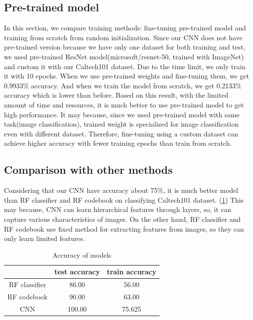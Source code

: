 \subsection{Pre-trained model}
In this section, we compare training methods: fine-tuning pre-trained model and training from scratch from random initialization. Since our CNN does not have pre-trained version because we have only one dataset for both training and test, we used pre-trained ResNet model(microsoft/resnet-50, trained with ImageNet) and custom it with our Caltech101 dataset. Due to the time limit, we only train it with 10 epochs. When we use pre-trained weights and fine-tuning them, we get 0.9933\% accuracy. And when we train the model from scratch, we get 0.2133\% accuracy which is lower than before. Based on this result, with the limited amount of time and resources, it is much better to use pre-trained model to get high performance. It may because, since we used pre-trained model with same task(image classification), trained weight is specialized for image classification even with different dataset. Therefore, fine-tuning using a custom dataset can achieve higher accuracy with fewer training epochs than train from scratch.

\subsection{Comparison with other methods}
Considering that our CNN have accuracy about 75\%, it is much better model than RF classifier and RF codebook on classifying Caltech101 dataset. (\cref{table:accuracy}) This may because, CNN can learn hierarchical features through layers, so, it can capture various characteristics of images. On the other hand, RF classifier and RF codebook use fixed method for extracting features from images, so they can only learn limited features.

\begin{table}[htbp]
	\centering
	\setlength{\tabcolsep}{10pt}
	\renewcommand{\arraystretch}{1.5}
	\begin{tabular}{|c||c|c|}
	\hline
	& test accuracy & train accuracy  \\ \hline\hline
	RF classifier & 86.00 & 56.00   \\ \hline
	RF codebook & 90.00 & 63.00  \\ \hline
	CNN & 100.00 & 75.625  \\ \hline
	\end{tabular}
        \caption{Accuracy of models}
	\label{table:accuracy}
\end{table}